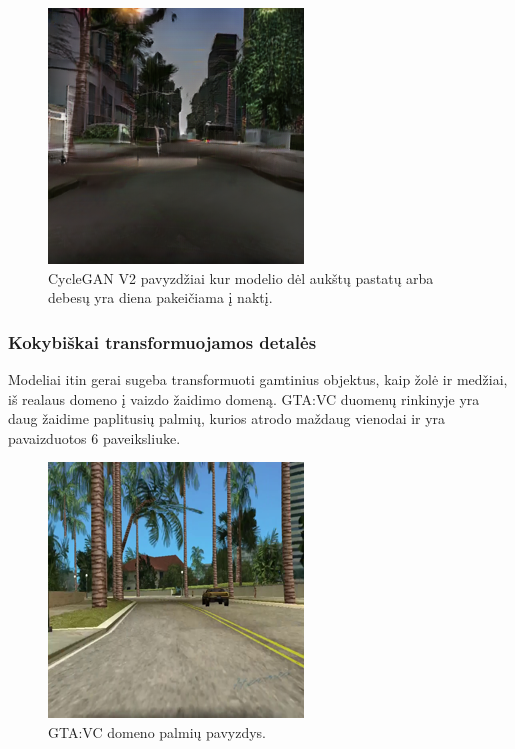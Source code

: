 \documentclass{VUMIFPSbakalaurinis}
\begin{document}
\begin{figure}[H]
                    \includegraphics[scale=0.7]{img/debesu_fake}
                    \caption{CycleGAN V2 pavyzdžiai kur modelio dėl aukštų pastatų arba debesų yra diena  pakeičiama į naktį.}
                    \label{img:day}
                \end{figure}
        \subsubsection{Kokybiškai transformuojamos detalės}
            Modeliai itin gerai sugeba transformuoti gamtinius objektus, kaip žolė ir medžiai, iš realaus domeno į vaizdo žaidimo domeną. GTA:VC duomenų rinkinyje yra daug žaidime paplitusių palmių, kurios atrodo maždaug vienodai ir yra pavaizduotos 6 paveiksliuke.
            \begin{figure}[H]
                \centering
                \includegraphics[scale=0.7]{img/palmiu_pvz}
                \caption{GTA:VC domeno palmių pavyzdys.}
                \label{img:mlp}
            \end{figure}
    
\end{document}
